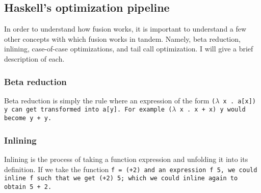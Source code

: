 \subsection{Haskell's optimization pipeline}
In order to understand how fusion works, it is important to understand a few other concepts with which fusion works in tandem.
Namely, beta reduction, inlining, case-of-case optimizations, and tail call optimization.
I will give a brief description of each.

\subsubsection{Beta reduction}
Beta reduction is simply the rule where an expression of the form \tt{($\lambda$ x . a[x]) y} can get transformed into \tt{a[y]}.
For example \tt{($\lambda$ x . x + x) y} would become \tt{y + y}.
\subsubsection{Inlining}
Inlining is the process of taking a function expression and unfolding it into its definition.
If we take the function \tt{f = (+2)} and an expression \tt{f 5}, we could inline \tt{f} such that we get \tt{(+2) 5}; which we could inline again to obtain \tt{5 + 2}.
